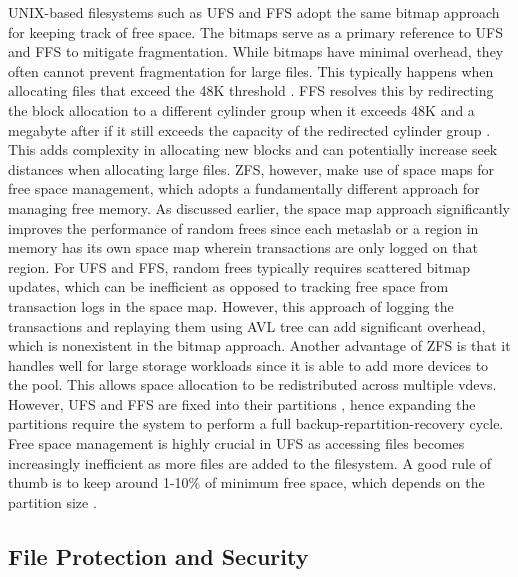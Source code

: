 UNIX-based filesystems such as UFS and FFS adopt the same bitmap approach for keeping track of free space. The bitmaps
serve as a primary reference to UFS and FFS to mitigate fragmentation. While bitmaps have minimal overhead, they often
cannot prevent fragmentation for large files. This typically happens when allocating files that exceed the 48K threshold
\parencite{freebsd_filesystem_org}. FFS resolves this by redirecting the block allocation to a different cylinder group
when it exceeds 48K and a megabyte after if it still exceeds the capacity of the redirected cylinder group \parencite{freebsd_filesystem_org}.
This adds complexity in allocating new blocks and can potentially increase seek distances when allocating large files.
ZFS, however, make use of space maps for free space management, which adopts a fundamentally different approach for managing free memory.
As discussed earlier, the space map approach significantly improves the performance of random frees since each metaslab
or a region in memory has its own space map wherein transactions are only logged on that region. For UFS and FFS,
random frees typically requires scattered bitmap updates, which can be inefficient as opposed to tracking free space from
transaction logs in the space map. However, this approach of logging the transactions and replaying them using AVL tree
can add significant overhead, which is nonexistent in the bitmap approach. Another advantage of ZFS is that it handles
well for large storage workloads since it is able to add more devices to the pool. This allows space allocation to be
redistributed across multiple vdevs. However, UFS and FFS are fixed into their partitions \parencite{schaumann},
hence expanding the partitions require the system to perform a full backup-repartition-recovery cycle. Free space management
is highly crucial in UFS as accessing files becomes increasingly inefficient as more files are added to the filesystem.
A good rule of thumb is to keep around 1-10\% of minimum free space, which depends on the partition size \parencite{oracle_min_freespace}.

\subsection{File Protection and Security} \label{file-protection-security} %

